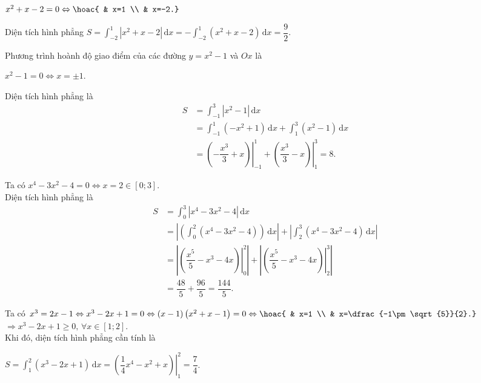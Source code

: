 \begin{bt}
{\begin{listEX}
			\begin{center}
				$x^2+x-2=0\Leftrightarrow \hoac{ 
				 & x=1 \\
				& x=-2.}$ 
			\end{center}
			Diện tích hình phẳng $S=\displaystyle\int_{-2}^{1}\left| x^2+x-2 \right|\mathrm{\,d}x=-\int_{-2}^{1}\left(  x^2+x-2 \right)\mathrm{\,d}x=\dfrac{9}{2}$.
			\item Phương  trình hoành độ giao điểm của các đường $y=x^2-1$ và $Ox$ là
			\begin{center}
				 $x^2-1=0\Leftrightarrow x=\pm 1$.
			\end{center}
			Diện tích hình  phẳng là
			\begin{align*}
				S&=\displaystyle\int_{-1}^{3}\left|  x^2-1 \right|\mathrm{\,d}x\\
				&=\int_{-1}^{1}\left( -x^2+1 \right)\mathrm{\,d}x+\int_{1}^{3}\left( x^2-1 \right)\mathrm{\,d}x\\ 
				 &=\left.\left( -\dfrac{x^3}{3}+x \right)\right|_{-1}^1+\left.\left( \dfrac{x^3}{3}-x \right)\right|_1^3=8.
			\end{align*}
			 \item Ta có $x^4-3x^2-4=0\Leftrightarrow x=2\in [0;3]$.\\
			Diện tích hình phẳng là 
			\begin{align*}
				S&=\displaystyle\int_{0}^{3}\left| x^4-3x^2-4 \right|\mathrm{\,d}x\\ 
				 &=\left| \left( \int_{0}^{2}\left( x^4-3x^2-4 \right) \right)\mathrm{\,d}x \right|+\left| \int_{2}^{3}\left( x^4-3x^2-4 \right)\mathrm{\,d}x \right|\\
				&=\left| \left. \left( \dfrac{x^5}{5}-x^3-4x \right) \right|_{0}^{2} \right|+\left| \left. \left( \dfrac{x^5}{5}-x^3-4x \right) \right|_{2}^{3} \right|\\ 
				&=\dfrac{48}{5}+\dfrac{96}{5}=\dfrac{144}{5}. 
			\end{align*}
			\item Ta có $x^3=2x-1\Leftrightarrow x^3-2x+1=0\Leftrightarrow  \left( x-1 \right)\left( x^2+x-1 \right)=0\Leftrightarrow \hoac{
			&  x=1 \\
			 & x=\dfrac{-1\pm \sqrt{5}}{2}.}$\\
			$\Rightarrow x^3-2x+1\ge  0,\,\forall x\in[1;2]$.\\
			Khi đó,  diện tích hình phẳng cần tính là
			\begin{center}
				 $S=\displaystyle\int_{1}^{2}\left( x^3-2x+1 \right)\mathrm{\,d}x=\left.\left( \dfrac{1}{4}x^4-x^2+x \right)\right|^2_1=\dfrac{7}{4}$.

\end{center}
\end{listEX}}
\end{bt}
